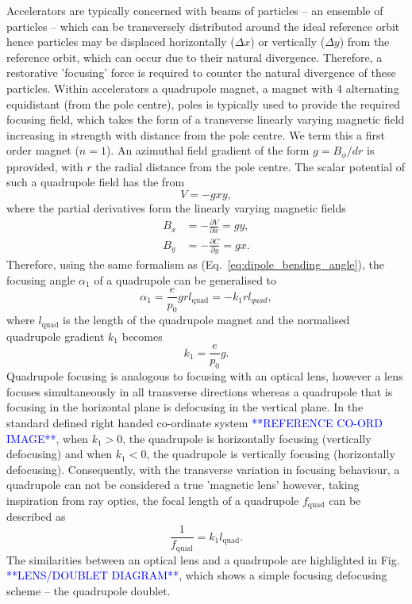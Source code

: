 \documentclass[../main.tex]{subfiles}
\begin{document}
Accelerators are typically concerned with beams of particles -- an ensemble of particles -- which can be transversely distributed around the ideal reference orbit hence particles may be  displaced horizontally ($\Delta x$) or vertically ($\Delta y$) from the reference orbit, which can occur due to their natural divergence. Therefore, a restorative 'focusing' force is required to counter the natural divergence of these particles. Within accelerators a quadrupole magnet, a magnet with 4 alternating equidistant (from the pole centre), poles is typically used to provide the required focusing field, which takes the form of a transverse linearly varying magnetic field increasing in strength with distance from the pole centre. We term this a first order magnet ($n=1$). An azimuthal field gradient of the form $g = B_{\phi}/dr$ is pprovided, with $r$ the radial distance from the pole centre. The scalar potential of such a quadrupole field has the from
\begin{equation}
V = -gxy,
\label{eq:quadrupole_potential}    
\end{equation}
where the partial derivatives form the linearly varying magnetic fields
\begin{align}
B_{x} &= -\frac{\partial V}{\partial x} = gy, \nonumber\\
B_{y} &= -\frac{\partial C}{\partial y} = gx.
\end{align}
Therefore, using the same formalism as (Eq.~\ref{eq:dipole_bending_angle}), the focusing angle $\alpha_{1}$ of a quadrupole can be generalised to
\begin{equation}
\alpha_{1} = \frac{e}{p_{0}}grl_{\mathrm{quad}} = -k_{1}rl_{quad},
\label{eq:quadrupole_focusing_angle}    
\end{equation}
where $l_{\mathrm{quad}}$ is the length of the quadrupole magnet and the normalised quadrupole gradient $k_{1}$ becomes
\begin{equation}
k_{1} = \frac{e}{p_{0}}g.
\label{eq:quadrupole_normalised_gradient}
\end{equation}
Quadrupole focusing is analogous to focusing with an optical lens, however a lens focuses simultaneously in all transverse directions whereas a quadrupole that is focusing in the horizontal plane is defocusing in the vertical plane. In the standard defined right handed co-ordinate system \textcolor{blue}{**REFERENCE CO-ORD IMAGE**}, when $k_{1} > 0$, the quadrupole is horizontally focusing (vertically defocusing) and when $k_{1} < 0$, the quadrupole is vertically focusing (horizontally defocusing). Consequently, with the transverse variation in focusing behaviour, a quadrupole can not be considered a true 'magnetic lens' however, taking inspiration from ray optics, the focal length of a quadrupole $f_{\mathrm{quad}}$ can be described as
\begin{equation}
\frac{1}{f_{\mathrm{quad}}} = k_{1}l_{\mathrm{quad}}.
\label{eq:focal_length}    
\end{equation}
The similarities between an optical lens and a quadrupole are highlighted in Fig. \textcolor{blue}{**LENS/DOUBLET DIAGRAM**}, which shows a simple focusing defocusing scheme -- the quadrupole doublet. 
\end{document}
